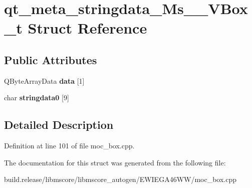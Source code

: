 \hypertarget{structqt__meta__stringdata___ms_____v_box__t}{}\section{qt\+\_\+meta\+\_\+stringdata\+\_\+\+Ms\+\_\+\+\_\+\+V\+Box\+\_\+t Struct Reference}
\label{structqt__meta__stringdata___ms_____v_box__t}
\subsection*{Public Attributes}
\begin{DoxyCompactItemize}
\item 
\mbox{\label{structqt__meta__stringdata___ms_____v_box__t_a7e54d766d8028e34785100a77dd46f20}} 
Q\+Byte\+Array\+Data {\bfseries data} \mbox{[}1\mbox{]}
\item 
\mbox{\label{structqt__meta__stringdata___ms_____v_box__t_ab27146f3fa6bf0f32ab95bd93ac8e222}} 
char {\bfseries stringdata0} \mbox{[}9\mbox{]}
\end{DoxyCompactItemize}


\subsection{Detailed Description}


Definition at line 101 of file moc\+\_\+box.\+cpp.



The documentation for this struct was generated from the following file\+:\begin{DoxyCompactItemize}
\item 
build.\+release/libmscore/libmscore\+\_\+autogen/\+E\+W\+I\+E\+G\+A46\+W\+W/moc\+\_\+box.\+cpp\end{DoxyCompactItemize}
